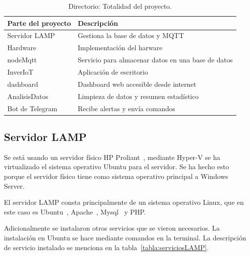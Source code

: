 \begin{table}[htbp]
\begin{center}
\caption{Directorio: Totalidad del proyecto.}
\begin{tabular}{|l|l|}
\hline
\rowcolor[HTML]{C0C0C0} 
\textbf{Parte del proyecto} & \textbf{Descripción}\\ \hline
Servidor LAMP & Gestiona la base de datos y MQTT\\ \hline
Hardware &  Implementación del harware\\ \hline
nodeMqtt & Servicio para almacenar datos en una base de datos \\ \hline
InverIoT &  Aplicación de escritorio\\ \hline
dashboard &  Dashboard web accesible desde internet \\ \hline
AnalisisDatos & Limpieza de datos y resumen estadístico \\ \hline
Bot de Telegram & Recibe alertas y envía comandos \\ \hline
\end{tabular}
\label{tabla:totalidadProyectoFuncional}
\end{center}
\end{table}

\subsection{Servidor LAMP}
Se está usando un servidor físico HP Proliant~\cite{misc:HP_ProLiant}, mediante Hyper-V se ha virtualizado el sistema operativo Ubuntu para el servidor. Se ha hecho esto porque el servidor físico tiene como sistema operativo principal a Windows Server.

El servidor LAMP consta principalmente de un sistema operativo Linux, que en este caso es Ubuntu~\cite{misc:Ubuntu}, Apache~\cite{misc:Apache}, Mysql~\cite{misc:Mysql} y PHP.

Adicionalmente se instalaron otros servicios que se vieron necesarios. La instalación en Ubuntu se hace mediante comandos en la terminal. La descripción de servicio instalado se menciona en la tabla~\ref{tabla:serviciosLAMP}.

